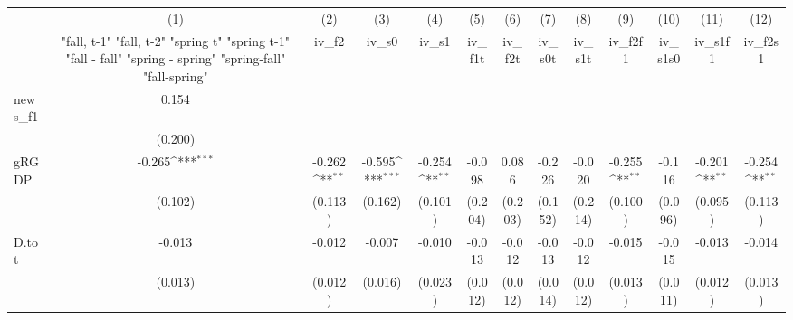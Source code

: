 {
\def\sym#1{\ifmmode^{#1}\else\(^{#1}\)\fi}
\begin{tabular}{l*{12}{c}}
\toprule
            &\multicolumn{1}{c}{(1)}&\multicolumn{1}{c}{(2)}&\multicolumn{1}{c}{(3)}&\multicolumn{1}{c}{(4)}&\multicolumn{1}{c}{(5)}&\multicolumn{1}{c}{(6)}&\multicolumn{1}{c}{(7)}&\multicolumn{1}{c}{(8)}&\multicolumn{1}{c}{(9)}&\multicolumn{1}{c}{(10)}&\multicolumn{1}{c}{(11)}&\multicolumn{1}{c}{(12)}\\
            &\multicolumn{1}{c}{  "fall, t-1" "fall, t-2" "spring t" "spring t-1"  "fall - fall" "spring - spring" "spring-fall" "fall-spring" }&\multicolumn{1}{c}{iv\_f2}&\multicolumn{1}{c}{iv\_s0}&\multicolumn{1}{c}{iv\_s1}&\multicolumn{1}{c}{iv\_f1t}&\multicolumn{1}{c}{iv\_f2t}&\multicolumn{1}{c}{iv\_s0t}&\multicolumn{1}{c}{iv\_s1t}&\multicolumn{1}{c}{iv\_f2f1}&\multicolumn{1}{c}{iv\_s1s0}&\multicolumn{1}{c}{iv\_s1f1}&\multicolumn{1}{c}{iv\_f2s1}\\
\midrule
news\_f1     &       0.154         &                     &                     &                     &                     &                     &                     &                     &                     &                     &                     &                     \\
            &     (0.200)         &                     &                     &                     &                     &                     &                     &                     &                     &                     &                     &                     \\
\addlinespace
gRGDP       &      -0.265\sym{***}&      -0.262\sym{**} &      -0.595\sym{***}&      -0.254\sym{**} &      -0.098         &       0.086         &      -0.226         &      -0.020         &      -0.255\sym{**} &      -0.116         &      -0.201\sym{**} &      -0.254\sym{**} \\
            &     (0.102)         &     (0.113)         &     (0.162)         &     (0.101)         &     (0.204)         &     (0.203)         &     (0.152)         &     (0.214)         &     (0.100)         &     (0.096)         &     (0.095)         &     (0.113)         \\
\addlinespace
D.tot       &      -0.013         &      -0.012         &      -0.007         &      -0.010         &      -0.013         &      -0.012         &      -0.013         &      -0.012         &      -0.015         &      -0.015         &      -0.013         &      -0.014         \\
            &     (0.013)         &     (0.012)         &     (0.016)         &     (0.023)         &     (0.012)         &     (0.012)         &     (0.014)         &     (0.012)         &     (0.013)         &     (0.011)         &     (0.012)         &     (0.013)         \\

\end{tabular}}
